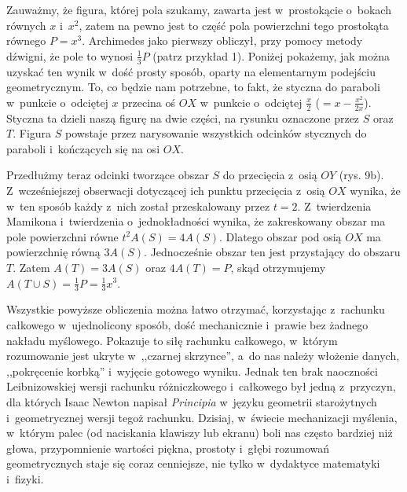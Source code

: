 Zauważmy, że figura, której pola szukamy, zawarta jest w~prostokącie o~bokach równych $x$ i~$x^2$, zatem na pewno jest to część pola powierzchni tego prostokąta równego $P = x^3$. Archimedes jako pierwszy obliczył,
przy pomocy metody dźwigni, że pole to wynosi 
$\frac{1}{3}P$ (patrz przykład 1). Poniżej pokażemy, jak można uzyskać ten wynik w~dość prosty sposób, oparty na elementarnym podejściu geometrycznym. 
To, co będzie nam potrzebne, to fakt, że styczna do paraboli w~punkcie o~odciętej
$x$ przecina oś $OX$ w~punkcie o~odciętej $\frac{x}{2}$ ($=x-\frac{x^2}{2x}$).   Styczna ta dzieli naszą figurę na dwie części, na rysunku oznaczone przez $S$ oraz $T$. Figura $S$ powstaje przez narysowanie wszystkich odcinków stycznych do paraboli i~kończących się na osi $OX$. 


%
Przedłużmy teraz odcinki tworzące obszar $S$ do przecięcia z~osią $OY$
(rys. 9b). 
Z~wcześniejszej obserwacji dotyczącej ich punktu przecięcia z~osią $OX$ wynika,
że w~ten sposób każdy z~nich został przeskalowany przez $t=2$.
Z~twierdzenia Mamikona i~twierdzenia o~jednokładności wynika, że
zakreskowany obszar ma pole powierzchni równe $t^2A(S)=4A(S)$.
Dlatego obszar pod osią
$OX$ ma powierzchnię równą $3A(S)$. Jednocześnie obszar ten
jest przystający do obszaru $T$. 
Zatem $A(T)=3A(S)$ oraz $4A(T) = P$, skąd otrzymujemy ${A(T\cup S) = \frac{1}{3}P=\frac{1}{3}x^3}$. 

Wszystkie powyższe obliczenia można łatwo otrzymać, korzystając z~rachunku
całkowego w~ujednolicony sposób, dość mechanicznie i~prawie bez żadnego nakładu
myślowego. Pokazuje to siłę rachunku całkowego, w~którym rozumowanie jest ukryte
w~,,czarnej skrzynce'', a~do nas należy włożenie danych, ,,pokręcenie korbką''
i~wyjęcie gotowego wyniku. Jednak ten brak naoczności Leibnizowskiej wersji
rachunku różniczkowego i~całkowego był jedną z~przyczyn, dla których Isaac
Newton napisał {\it Principia} w~języku geometrii starożytnych i~geometrycznej
wersji tegoż rachunku. Dzisiaj, w~świecie mechanizacji myślenia, w~którym palec
(od naciskania klawiszy lub ekranu) boli nas często bardziej niż głowa, przypomnienie
wartości piękna, prostoty i~głębi rozumowań geometrycznych staje się coraz
cenniejsze, nie tylko w~dydaktyce matematyki i~fizyki.  
